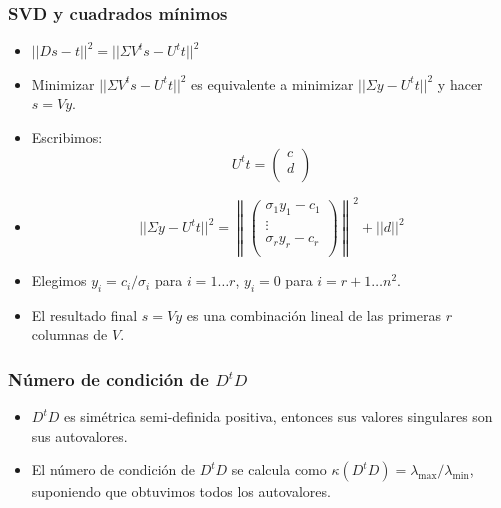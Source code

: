 \documentclass{beamer}
\begin{document}
\begin{frame}
\frametitle{SVD y cuadrados mínimos}

\begin{itemize}
\item<1->$||Ds - t||^2 = ||\Sigma V^t s - U^tt||^2$
\item<2->Minimizar $||\Sigma V^t s - U^tt||^2$ es equivalente a minimizar $||\Sigma y - U^tt||^2$ y hacer $s = Vy$.
\item<3-> Escribimos:
\[
U^tt = 
\begin{pmatrix}
    c \\
    d \\
\end{pmatrix}
\]
\item<4->
\[
||\Sigma y - U^tt||^2 = 
\left\lVert
\begin{pmatrix}
    \sigma_1 y_1 - c_1 \\
    \vdots \\
    \sigma_r y_r - c_r \\
\end{pmatrix}
\right\rVert^2
+ ||d||^2
\]
\item<5-> Elegimos $y_i = c_i / \sigma_i$ para $i = 1 \ldots r$, $y_i = 0$ para $i = r+1 \ldots n^2$.
\item<6-> El resultado final $s = Vy$ es una combinación lineal de las primeras $r$ columnas de $V$.
\end{itemize}

\end{frame}

\begin{frame}
\frametitle{Número de condición de $D^tD$}
\begin{itemize}
\item $D^tD$ es simétrica semi-definida positiva, entonces sus valores singulares son sus autovalores.
\item El número de condición de $D^tD$ se calcula como $\kappa(D^tD) = \lambda_{\text{max}} / \lambda_{\text{min}}$, 
suponiendo que obtuvimos todos los autovalores.
\end{itemize}
\end{frame}


\end{document}
